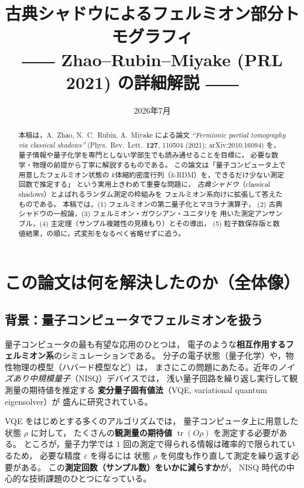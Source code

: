 \documentclass[11pt,a4paper]{ltjsarticle}
\title{\bfseries 古典シャドウによるフェルミオン部分トモグラフィ\\[4pt]
  \large ―― Zhao--Rubin--Miyake (PRL 2021) の詳細解説 ――}
\author{}
\date{2026年7月}
\newcommand{\tr}{\operatorname{tr}}
\theoremstyle{definition}
\theoremstyle{plain}
\begin{document}
\maketitle

\begin{abstract}
\noindent
本稿は，A.\ Zhao, N.\ C.\ Rubin, A.\ Miyake による論文
\textit{``Fermionic partial tomography via classical shadows''}
(Phys.\ Rev.\ Lett.\ \textbf{127}, 110504 (2021); arXiv:2010.16094) を，
量子情報や量子化学を専門としない学部生でも読み通せることを目標に，
必要な数学・物理の前提から丁寧に解説するものである。
この論文は「量子コンピュータ上で用意したフェルミオン状態の
$k$体縮約密度行列（$k$-RDM）を，できるだけ少ない測定回数で推定する」
という実用上きわめて重要な問題に，
\emph{古典シャドウ}（classical shadows）とよばれるランダム測定の枠組みを
フェルミオン系向けに拡張して答えたものである。
本稿では，(1) フェルミオンの第二量子化とマヨラナ演算子，
(2) 古典シャドウの一般論，(3) フェルミオン・ガウシアン・ユニタリを
用いた測定アンサンブル，(4) 主定理（サンプル複雑性の見積もり）とその導出，
(5) 粒子数保存版と数値結果，の順に，式変形をなるべく省略せずに追う。
\end{abstract}

\tableofcontents

\section{この論文は何を解決したのか（全体像）}

\subsection{背景：量子コンピュータでフェルミオンを扱う}
量子コンピュータの最も有望な応用のひとつは，
電子のような\textbf{相互作用するフェルミオン系}のシミュレーションである。
分子の電子状態（量子化学）や，物性物理の模型（ハバード模型など）は，
まさにこの問題にあたる。近年の\emph{ノイズあり中規模量子}（NISQ）デバイスでは，
浅い量子回路を繰り返し実行して観測量の期待値を推定する
\textbf{変分量子固有値法}（VQE, variational quantum eigensolver）が
盛んに研究されている。

VQE をはじめとする多くのアルゴリズムでは，
量子コンピュータ上に用意した状態 $\rho$ に対して，
たくさんの\textbf{観測量の期待値} $\tr(O\rho)$ を測定する必要がある。
ところが，量子力学では 1 回の測定で得られる情報は確率的で限られているため，
必要な精度 $\varepsilon$ を得るには
状態 $\rho$ を何度も作り直して測定を繰り返す必要がある。
この\textbf{測定回数（サンプル数）をいかに減らすか}が，
NISQ 時代の中心的な技術課題のひとつになっている。
\end{document}
